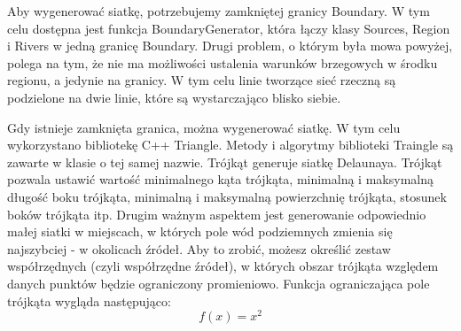 \documentclass[]{pracamgr}
\begin{document}
      Aby wygenerować siatkę, potrzebujemy zamkniętej granicy Boundary. W tym celu dostępna jest funkcja BoundaryGenerator, która łączy klasy Sources, Region i Rivers w jedną granicę Boundary. Drugi problem, o którym była mowa powyżej, polega na tym, że nie ma możliwości ustalenia warunków brzegowych w środku regionu, a jedynie na granicy. W tym celu linie tworzące sieć rzeczną są podzielone na dwie linie, które są wystarczająco blisko siebie.

      Gdy istnieje zamknięta granica, można wygenerować siatkę. W tym celu wykorzystano bibliotekę C++ Triangle\cite{szewczuk1996triangle}. Metody i algorytmy biblioteki Traingle są zawarte w klasie o tej samej nazwie. Trójkąt generuje siatkę Delaunaya. Trójkąt pozwala ustawić wartość minimalnego kąta trójkąta, minimalną i maksymalną długość boku trójkąta, minimalną i maksymalną powierzchnię trójkąta, stosunek boków trójkąta itp. Drugim ważnym aspektem jest generowanie odpowiednio małej siatki w miejscach, w których pole wód podziemnych zmienia się najszybciej - w okolicach źródeł. Aby to zrobić, możesz określić zestaw współrzędnych (czyli współrzędne źródeł), w których obszar trójkąta względem danych punktów będzie ograniczony promieniowo. Funkcja ograniczająca pole trójkąta wygląda następująco:
      \begin{equation}
        f(x) = x^{2}
      \end{equation}
\end{document}
